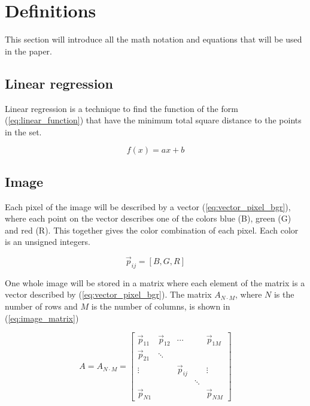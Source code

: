 \section{Definitions}
This section will introduce all the math notation and equations that will be used in the paper. 

\subsection{Linear regression}
\label{sec:regression}
Linear regression is a technique to find the function of the form (\ref{eq:linear_function}) that have the minimum total square distance to the points in the set. 

\begin{equation}
    f(x) = ax + b
    \label{eq:linear_function}
\end{equation}


\subsection{Image}

Each pixel of the image will be described by a vector (\ref{eq:vector_pixel_bgr}), where each point on the vector describes one of the colors blue (B), green (G) and red (R).  This together gives the color combination of each pixel. Each color is an unsigned integers. 


\begin{equation}
    \label{eq:vector_pixel_bgr}
    \vec{p}_{ij} = [B,G,R]
\end{equation} 

One whole image will be stored in a matrix where each element of the matrix is a vector described by (\ref{eq:vector_pixel_bgr}). The matrix $A_{N\cdot M}$, where $N$ is the number of rows and $M$ is the number of columns, is shown in (\ref{eq:image_matrix})

\begin{equation}
    \label{eq:image_matrix}
    A = A_{N\cdot M} =  
    \begin{bmatrix}
        \vec{p}_{11} & \vec{p}_{12} & \cdots & & \vec{p}_{1M}  \\
        \vec{p}_{21} & \ddots &        &       &                \\
        \vdots       &        &\vec{p}_{ij}&   & \vdots          \\
                     &        &        & \ddots&                  \\
        \vec{p}_{N1} &        &        &       & \vec{p}_{NM}  
    \end{bmatrix}
\end{equation}


